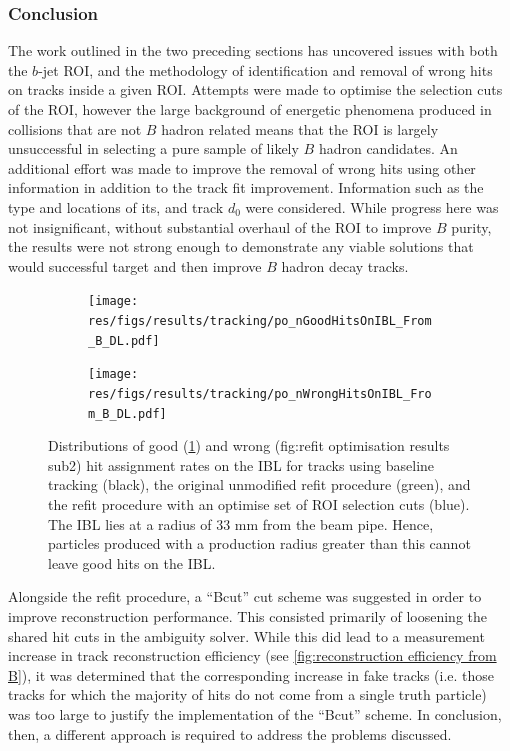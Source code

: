 \subsubsection{Conclusion}
The work outlined in the two preceding sections has uncovered issues with both the $b$-jet ROI, and the methodology of identification and removal of wrong hits on tracks inside a given ROI. Attempts were made to optimise the selection cuts of the ROI, however the large background of energetic phenomena produced in collisions that are not $B$ hadron related means that the ROI is largely unsuccessful in selecting a pure sample of likely $B$ hadron candidates. An additional effort was made to improve the removal of wrong hits using other information in addition to the track fit improvement. Information such as the type and locations of its, and track $d_0$ were considered. While progress here was not insignificant, without substantial overhaul of the ROI to improve $B$ purity, the results were not strong enough to demonstrate any viable solutions that would successful target and then improve $B$ hadron decay tracks.
%
\begin{figure}[!htbp]
    \centering
    \begin{subfigure}{.5\textwidth}
      \centering
      \texttt{[image: res/figs/results/tracking/po\_nGoodHitsOnIBL\_From\_B\_DL.pdf]}
      \caption{}
      \label{fig:refit optimisation results sub1}
    \end{subfigure}%
    \begin{subfigure}{.5\textwidth}
      \centering
      \texttt{[image: res/figs/results/tracking/po\_nWrongHitsOnIBL\_From\_B\_DL.pdf]}
      \caption{}
      \label{fig:refit optimisation results sub2}
    \end{subfigure}
    \caption{Distributions of good (\cref{fig:refit optimisation results sub1}) and wrong (fig:refit optimisation results sub2) hit assignment rates on the IBL for tracks using baseline tracking (black), the original unmodified refit procedure (green), and the refit procedure with an optimise set of ROI selection cuts (blue). The IBL lies at a radius of 33 mm from the beam pipe. Hence, particles produced with a production radius greater than this cannot leave good hits on the IBL.}
    \label{fig:refit optimisation results}
\end{figure}
%
Alongside the refit procedure, a ``Bcut'' cut scheme was suggested in order to improve reconstruction performance. This consisted primarily of loosening the shared hit cuts in the ambiguity solver. While this did lead to a measurement increase in track reconstruction efficiency (see \cref{fig:reconstruction efficiency from B}), it was determined that the corresponding increase in fake tracks (i.e. those tracks for which the majority of hits do not come from a single truth particle) was too large to justify the implementation of the ``Bcut'' scheme. In conclusion, then, a different approach is required to address the problems discussed.



